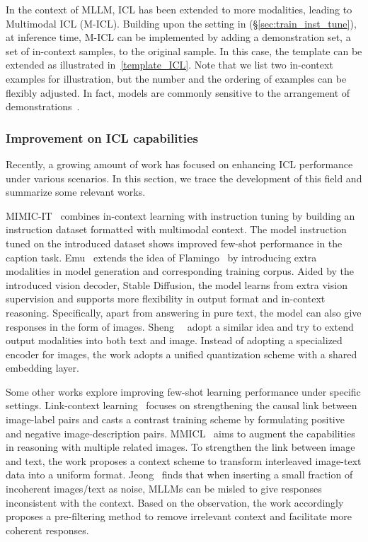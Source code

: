 In the context of MLLM, ICL has been extended to more modalities, leading to Multimodal ICL (M-ICL).
Building upon the setting in (\S \ref{sec:train_inst_tune}), at inference time, M-ICL can be implemented by adding a demonstration set, \ie a set of in-context samples, to the original sample. 
In this case, the template can be extended as illustrated in~\cref{template_ICL}. 
Note that we list two in-context examples for illustration, but the number and the ordering of examples can be flexibly adjusted. In fact, models are commonly sensitive to the arrangement of demonstrations~\cite{dong2022survey, lu2021fantastically}.

\subsubsection{Improvement on ICL capabilities}
Recently, a growing amount of work has focused on enhancing ICL performance under various scenarios. In this section, we trace the development of this field and summarize some relevant works.

MIMIC-IT~\cite{li2023mimic} combines in-context learning with instruction tuning by building an instruction dataset formatted with multimodal context. The model instruction tuned on the introduced dataset shows improved few-shot performance in the caption task.
Emu~\cite{sun2023generative} extends the idea of Flamingo~\cite{alayrac2022flamingo} by introducing extra modalities in model generation and corresponding training corpus. Aided by the introduced vision decoder, \ie Stable Diffusion, the model learns from extra vision supervision and supports more flexibility in output format and in-context reasoning. Specifically, apart from answering in pure text, the model can also give responses in the form of images. 
Sheng~\etal~\cite{sheng2023towards} adopt a similar idea and try to extend output modalities into both text and image. Instead of adopting a specialized encoder for images, the work adopts a unified quantization scheme with a shared embedding layer.


Some other works explore improving few-shot learning performance under specific settings. 
Link-context learning~\cite{tai2023link} focuses on strengthening the causal link between image-label pairs and casts a contrast training scheme by formulating positive and negative image-description pairs.
MMICL~\cite{zhao2023mmicl} aims to augment the capabilities in reasoning with multiple related images. To strengthen the link between image and text, the work proposes a context scheme to transform interleaved image-text data into a uniform format.
Jeong~\cite{jeong2023hijacking} finds that when inserting a small fraction of incoherent images/text as noise, MLLMs can be misled to give responses inconsistent with the context. Based on the observation, the work accordingly proposes a pre-filtering method to remove irrelevant context and facilitate more coherent responses.



